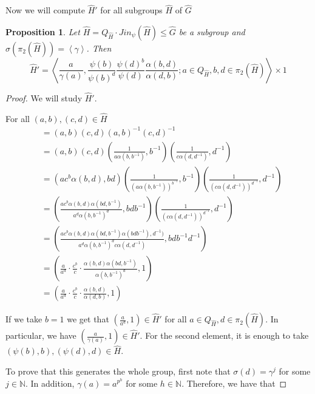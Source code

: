 \documentclass{article}
\newtheorem{proposition}[theorem]{Proposition}
\begin{document}
Now we will compute $\hat{H}'$ for all subgroups $\hat{H}$ of $\hat{G}$

\begin{proposition} \label{H'}
    Let $\hat{H}=Q_{\hat{H}} \cdot Jin_\psi(\hat{H}) \leq \hat{G}$ be a subgroup and $\sigma(\pi_2(\hat{H})) = \left \langle \gamma \right \rangle$. Then 
    \begin{equation}
        \hat{H}' = \left\langle \frac{a}{\gamma(a)}, \frac{\psi(b)}{\psi(b)^d}\frac{\psi(d)^b}{\psi(d)} \frac{\alpha(b,d) }{\alpha(d,b)}; a\in  Q_{\hat{H}}, b,d \in \pi_2(\hat{H}) \right\rangle \times {1}
    \end{equation}
\end{proposition}

\begin{proof}
We will study $\hat{H}'$.

For all $(a,b),(c,d) \in \hat{H}$
    \begin{align*}
        [(a,b), (c,d)] & = (a,b) (c,d) (a,b)^{-1} (c,d)^{-1} \\
         & = (a,b) (c,d) \left(\frac{1}{a\alpha(b,b^{-1})}, b^{-1} \right)\left(\frac{1}{c\alpha(d,d^{-1})}, d^{-1} \right) \\
         & =\left(ac^b \alpha(b,d), bd\right)\left(\frac{1}{(a\alpha(b,b^{-1}))^{b^{-1}}}, b^{-1} \right)\left(\frac{1}{(c\alpha(d,d^{-1}))^{d^{-1}}}, d^{-1} \right) \\
         & = \left( \frac{ac^b \alpha(b,d) \alpha(bd,b^{-1})}{a^{d}\alpha(b,b^{-1})^{d}},bdb^{-1} \right) \left(\frac{1}{(c\alpha(d,d^{-1}))^{d^{-1}}}, d^{-1} \right)  \\
         & = \left( \frac{ac^b \alpha(b,d)\alpha(bd,b^{-1}) \alpha(bdb^{-1}),d^{-1})}{a^{d}\alpha(b,b^{-1})^{d} c \alpha(d,d^{-1})} ,bdb^{-1} d^{-1}\right) \\
         & = \left( \frac{a}{a^d} \cdot \frac{c^b}{c} \cdot \frac{\alpha(b,d)\alpha(bd,b^{-1}) }{\alpha(b,b^{-1})^{d}} ,1\right) \\
          & = \left( \frac{a}{a^d} \cdot \frac{c^b}{c} \cdot \frac{\alpha(b,d) }{\alpha(d,b)} ,1\right) 
    \end{align*} 

 If we take $b=1$ we get that $\left(\frac{a}{a^d},1\right)\in \hat{H}'$ for all $a\in Q_{\hat{H}}, d \in \pi_2(\hat{H})$. In particular, we have $\left(\frac{a}{\gamma(a)},1\right)\in \hat{H}'$. For the second element, it is enough to take $(\psi(b),b),( \psi(d),d) \in \hat{H}$. 

To prove that this generates the whole group, first note that  $\sigma(d) = \gamma^j$ for some $j\in \mathbb{N}$. In addition, $\gamma(a)=a^{p^h}$ for some $h\in \mathbb{N}$. Therefore, we have that


\end{proof}
\end{document}
